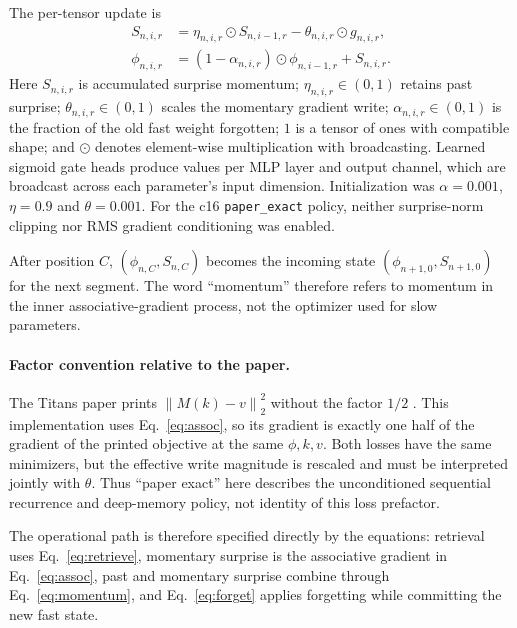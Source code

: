 \documentclass[10pt,twocolumn]{article}
\newcommand{\code}[1]{\texttt{#1}}
\newcommand{\norm}[1]{\left\lVert#1\right\rVert}
\newcommand{\had}{\odot}
\begin{document}
The per-tensor update is
\begin{align}
S_{n,i,r}&=\eta_{n,i,r}\had S_{n,i-1,r}-\theta_{n,i,r}\had g_{n,i,r},\label{eq:momentum}\\
\phi_{n,i,r}&=(1-\alpha_{n,i,r})\had\phi_{n,i-1,r}+S_{n,i,r}.\label{eq:forget}
\end{align}
Here $S_{n,i,r}$ is accumulated surprise momentum; $\eta_{n,i,r}\in(0,1)$ retains past surprise; $\theta_{n,i,r}\in(0,1)$ scales the momentary gradient write; $\alpha_{n,i,r}\in(0,1)$ is the fraction of the old fast weight forgotten; $1$ is a tensor of ones with compatible shape; and $\had$ denotes element-wise multiplication with broadcasting. Learned sigmoid gate heads produce values per MLP layer and output channel, which are broadcast across each parameter's input dimension. Initialization was $\alpha=0.001$, $\eta=0.9$ and $\theta=0.001$. For the c16 \code{paper\_exact} policy, neither surprise-norm clipping nor RMS gradient conditioning was enabled.

After position $C$, $(\phi_{n,C},S_{n,C})$ becomes the incoming state $(\phi_{n+1,0},S_{n+1,0})$ for the next segment. The word ``momentum'' therefore refers to momentum in the inner associative-gradient process, not the optimizer used for slow parameters.

\paragraph{Factor convention relative to the paper.}
The Titans paper prints $\norm{M(k)-v}_2^2$ without the factor $1/2$ \cite{behrouz2025titans}. This implementation uses Eq.~\eqref{eq:assoc}, so its gradient is exactly one half of the gradient of the printed objective at the same $\phi,k,v$. Both losses have the same minimizers, but the effective write magnitude is rescaled and must be interpreted jointly with $\theta$. Thus ``paper exact'' here describes the unconditioned sequential recurrence and deep-memory policy, not identity of this loss prefactor.

The operational path is therefore specified directly by the equations: retrieval uses Eq.~\eqref{eq:retrieve}, momentary surprise is the associative gradient in Eq.~\eqref{eq:assoc}, past and momentary surprise combine through Eq.~\eqref{eq:momentum}, and Eq.~\eqref{eq:forget} applies forgetting while committing the new fast state.
\end{document}
